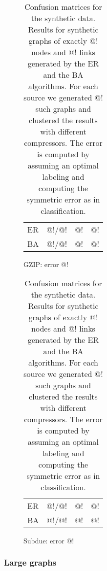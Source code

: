 \documentclass[10pt,a4paper,oneside]{article}
\begin{document}
\begin{table}[h]
\label{table:synthetic-small}

\begin{subfigure}[b]{0.5\columnwidth}
	\label{table:gzip-small}
	\centering
	\begin{tabular}{l | r | r r}
	\hline
	  ER & @!/@! & @! & @! \\
	  BA & @!/@! & @! & @! \\
	\hline
	\end{tabular}
	\caption{GZIP: error @!}
\end{subfigure}\begin{subfigure}[b]{0.5\columnwidth}
	\label{table:subdue-small}
	\centering
	\begin{tabular}{l| r | r r}
	\hline
	  ER & @!/@! & @! & @! \\
	  BA & @!/@! & @! & @! \\
	\hline
	\end{tabular}
	\caption{Subdue: error @!}
\end{subfigure}

\caption{Confusion matrices for the synthetic data. Results for synthetic graphs of exactly @! nodes and @! links generated by the ER and the BA algorithms. For each source we generated @! such graphs and clustered the results with different compressors. The error is computed by assuming an optimal labeling and computing the symmetric error as in classification.}
\end{table}

\subsubsection*{Large graphs}
\end{document}
